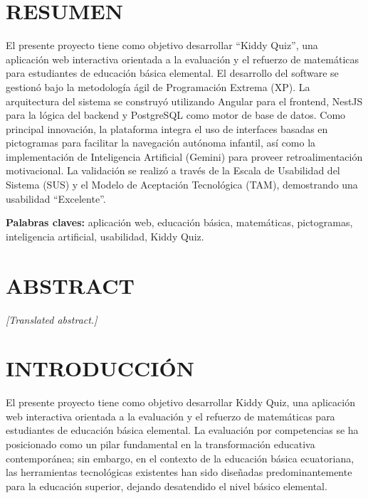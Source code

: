 \documentclass[12pt,a4paper]{report}
\begin{document}
\chapter*{RESUMEN}
El presente proyecto tiene como objetivo desarrollar ``Kiddy Quiz'', una aplicación web interactiva orientada a la evaluación y el refuerzo de matemáticas para estudiantes de educación básica elemental. El desarrollo del software se gestionó bajo la metodología ágil de Programación Extrema (XP). La arquitectura del sistema se construyó utilizando Angular para el frontend, NestJS para la lógica del backend y PostgreSQL como motor de base de datos. Como principal innovación, la plataforma integra el uso de interfaces basadas en pictogramas para facilitar la navegación autónoma infantil, así como la implementación de Inteligencia Artificial (Gemini) para proveer retroalimentación motivacional. La validación se realizó a través de la Escala de Usabilidad del Sistema (SUS) y el Modelo de Aceptación Tecnológica (TAM), demostrando una usabilidad ``Excelente''.

\textbf{Palabras claves:} aplicación web, educación básica, matemáticas, pictogramas, inteligencia artificial, usabilidad, Kiddy Quiz.

\chapter*{ABSTRACT}
\textit{[Translated abstract.]}

\tableofcontents
\listoftables
\listoffigures

\clearpage
{}
\setcounter{page}{1}

\chapter*{INTRODUCCIÓN}

El presente proyecto tiene como objetivo desarrollar Kiddy Quiz, una aplicación web interactiva orientada a la evaluación y el refuerzo de matemáticas para estudiantes de educación básica elemental. La evaluación por competencias se ha posicionado como un pilar fundamental en la transformación educativa contemporánea; sin embargo, en el contexto de la educación básica ecuatoriana, las herramientas tecnológicas existentes han sido diseñadas predominantemente para la educación superior, dejando desatendido el nivel básico elemental.
\end{document}
